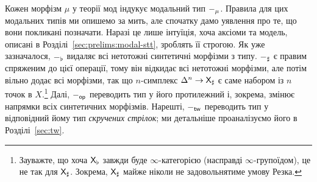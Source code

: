 \documentclass[12pt]{article}
\newcommand{\GM}{\flat}
\newcommand{\SM}{\sharp}
\newcommand{\OM}{\mathsf{op}}
\newcommand{\TM}{\mathsf{tw}}
\begin{document}
Кожен морфізм $\mu$ у теорії мод індукує модальний тип $\Modify[\mu]{-}$. Правила для цих модальних типів ми опишемо за мить, але спочатку дамо уявлення про те, що вони покликані позначати. Наразі це лише інтуїція, хоча аксіоми та модель, описані в Розділі~\ref{sec:prelims:modal-stt}, зроблять її строгою. Як уже зазначалося, $\Modify[\GM]{-}$ видаляє всі нетотожні синтетичні морфізми з типу. $\Modify[\SM]{-}$ є правим спряженим до цієї операції, тому він відкидає всі нетотожні морфізми, але потім вільно додає всі морфізми, так що $n$-симплекс $\Delta^n \to \Modify[\SM]{X}$ є саме набором із $n$ точок в $X$.\footnote{Зауважте, що хоча $\Modify[\GM]{X}$ завжди буде $\infty$-категорією (насправді $\infty$-групоїдом), це не так для $\Modify[\SM]{X}$. Зокрема, $\Modify[\SM]{X}$ майже ніколи не задовольнятиме умову Резка.} Далі, $\Modify[\OM]{-}$ переводить тип у його протилежний і, зокрема, змінює напрямки всіх синтетичних морфізмів. Нарешті, $\Modify[\TM]{-}$ переводить тип у відповідний йому тип \emph{скручених стрілок}; ми детальніше проаналізуємо його в Розділі~\ref{sec:tw}.
\end{document}

